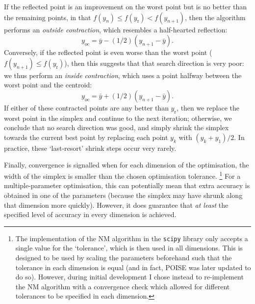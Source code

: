 If the reflected point is an improvement on the worst point but is no better than the remaining points, in that $f(y_n) \leq f(y_\text{r}) < f(y_{n+1})$, then the algorithm performs an \textit{outside contraction}, which resembles a half-hearted reflection:
\begin{equation}
    \label{eq:nm_outside_contract}
    y_\text{oc} = \bar{y} - (1/2)(y_{n+1} - \bar{y}).
\end{equation}
Conversely, if the reflected point is even worse than the worst point ($f(y_{n+1}) \leq f(y_\text{r})$), then this suggests that that search direction is very poor: we thus perform an \textit{inside contraction}, which uses a point halfway between the worst point and the centroid:
\begin{equation}
    \label{eq:nm_inside_contract}
    y_\text{oc} = \bar{y} + (1/2)(y_{n+1} - \bar{y}).
\end{equation}
If either of these contracted points are any better than $y_\text{r}$, then we replace the worst point in the simplex and continue to the next iteration; otherwise, we conclude that no search direction was good, and simply shrink the simplex towards the current best point by replacing each point $y_k$ with $(y_k + y_1)/2$.
In practice, these `last-resort' shrink steps occur very rarely.

Finally, convergence is signalled when for each dimension of the optimisation, the width of the simplex is smaller than the chosen optimisation tolerance.%
\footnote{The implementation of the NM algorithm in the \texttt{scipy} library only accepts a single value for the `tolerance', which is then used in all dimensions.
This is designed to be used by scaling the parameters beforehand such that the tolerance in each dimension is equal (and in fact, POISE was later updated to do so).
However, during initial development I chose instead to re-implement the NM algorithm with a convergence check which allowed for different tolerances to be specified in each dimension.}
For a multiple-parameter optimisation, this can potentially mean that extra accuracy is obtained in one of the parameters (because the simplex may have shrunk along that dimension more quickly).
However, it does guarantee that \textit{at least} the specified level of accuracy in every dimension is achieved.

